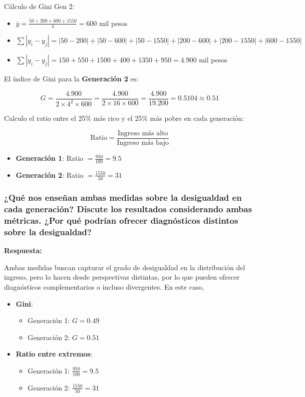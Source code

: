 \documentclass[
]{article}
\providecommand{\tightlist}{%
  \setlength{\itemsep}{0pt}\setlength{\parskip}{0pt}}\usepackage{longtable,booktabs,array}
\begin{document}
Cálculo de Gini Gen 2:

\begin{itemize}
\item
  \(\bar{y} = \frac{50 + 200 + 600 + 1550}{4} = 600\) mil pesos
\item
  \(\sum |y_i - y_j| = |50 - 200| + |50 - 600| + |50 - 1550| + |200 - 600| + |200 - 1550| + |600 - 1550|\)
\item
  \(\sum |y_i - y_j| = 150 + 550 + 1500 + 400 + 1350 + 950 = 4.900\) mil
  pesos
\end{itemize}

El índice de Gini para la \textbf{Generación 2} es:

\[G = \frac{4.900}{2 \times 4^2 \times 600} = \frac{4.900}{2 \times 16 \times 600} = \frac{4.900}{19.200} = 0.5104 \approx 0.51\]

Calculo el ratio entre el 25\% más rico y el 25\% más pobre en cada
generación:

\[\text{Ratio} = \frac{\text{Ingreso más alto}}{\text{Ingreso más bajo}}\]

\begin{itemize}
\item
  \textbf{Generación 1}: Ratio \(= \frac{950}{100} = 9.5\)
\item
  \textbf{Generación 2}: Ratio \(= \frac{1550}{50} = 31\)
\end{itemize}

\subsubsection{¿Qué nos enseñan ambas medidas sobre la desigualdad en
cada generación? Discute los resultados considerando ambas métricas.
¿Por qué podrían ofrecer diagnósticos distintos sobre la
desigualdad?}\label{quuxe9-nos-enseuxf1an-ambas-medidas-sobre-la-desigualdad-en-cada-generaciuxf3n-discute-los-resultados-considerando-ambas-muxe9tricas.-por-quuxe9-podruxedan-ofrecer-diagnuxf3sticos-distintos-sobre-la-desigualdad}

\textbf{Respuesta:}

Ambas medidas buscan capturar el grado de desigualdad en la distribución
del ingreso, pero lo hacen desde perspectivas distintas, por lo que
pueden ofrecer diagnósticos complementarios o incluso divergentes. En
este caso,

\begin{itemize}
\tightlist
\item
  \textbf{Gini}:

  \begin{itemize}
  \tightlist
  \item
    Generación 1: \(G = 0.49\)
  \item
    Generación 2: \(G = 0.51\)
  \end{itemize}
\item
  \textbf{Ratio entre extremos}:

  \begin{itemize}
  \tightlist
  \item
    Generación 1: \(\frac{950}{100} = 9.5\)
  \item
    Generación 2: \(\frac{1550}{50} = 31\)
  \end{itemize}
\end{itemize}
\end{document}
